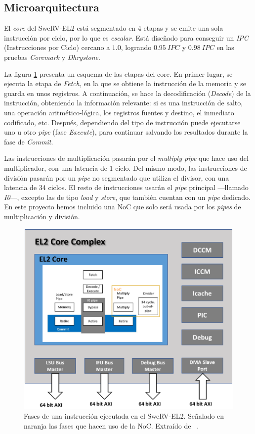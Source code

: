 \subsection{Microarquitectura}
El \textit{core} del SweRV-EL2 está segmentado en 4 etapas y se emite una sola instrucción por ciclo, por lo que es \textit{escalar}. Está diseñado para conseguir un \textit{IPC} (Instrucciones por Ciclo) cercano a $1.0$, logrando $0.95\ IPC$ y $0.98\ IPC$ en las pruebas \textit{Coremark} y \textit{Dhrystone}.

La figura \ref{fig:swerv_complex} presenta un esquema de las etapas del core. En primer lugar, se ejecuta la etapa de \textit{Fetch}, en la que se obtiene la instrucción de la memoria y se guarda en unos registros. A continuación, se hace la decodificación (\textit{Decode}) de la instrucción, obteniendo la información relevante: si es una instrucción de salto, una operación aritmético-lógica, los registros fuentes y destino, el inmediato codificado, etc. Después, dependiendo del tipo de instrucción puede ejecutarse uno u otro \textit{pipe} (fase \textit{Execute}), para continuar salvando los resultados durante la fase de \textit{Commit}.

Las instrucciones de multiplicación pasarán por el \textit{multiply pipe} que hace uso del multiplicador, con una latencia de 1 ciclo. Del mismo modo, las instrucciones de división pasarán por un \textit{pipe} no segmentado que utiliza el divisor, con una latencia de 34 ciclos. El resto de instrucciones usarán el \textit{pipe} principal ---llamado \textit{I0}---, excepto las de tipo \textit{load} y \textit{store}, que también cuentan con un \textit{pipe} dedicado. 
En este proyecto hemos incluido una NoC que solo será usada por los \textit{pipes} de multiplicación y división.

\begin{figure}[h]
    \centering
    \includegraphics[width=.7\textwidth]{images/diagrams/swerv_architecture.drawio.png}
    \caption[Fases de una instrucción ejecutada en el SweRV-EL2.]{Fases de una instrucción ejecutada en el SweRV-EL2. Señalado en naranja las fases que hacen uso de la NoC. Extraído de ~\cite{SweRVRoadmap}.}
    \label{fig:swerv_complex}
\end{figure}

